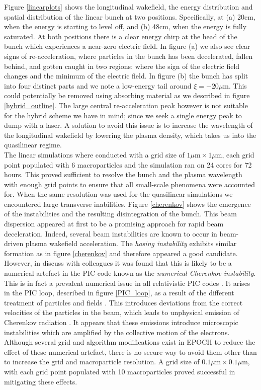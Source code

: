 \indent Figure \ref{linearplots} shows the longitudinal wakefield, the energy distribution and spatial distribution of the linear bunch at two positions. Specifically, at (a) 20cm, when the energy is starting to level off, and (b) 48cm, when the energy is fully saturated. At both positions there is a clear energy chirp at the head of the bunch which experiences a near-zero electric field. In figure (a) we also see clear signs of re-acceleration, where particles in the bunch has been decelerated, fallen behind, and gotten caught in two regions: where the sign of the electric field changes and the minimum of the electric field. In figure (b) the bunch has split into four distinct parts and we note a low-energy tail around $\xi=-20 \mu\text{m}$. This could potentially be removed using absorbing material as we described in figure \ref{hybrid_outline}. The large central re-acceleration peak however is not suitable for the hybrid scheme we have in mind; since we seek a single energy peak to dump with a laser. A solution to avoid this issue is to increase the wavelength of the longitudinal wakefield by lowering the plasma density, which takes us into the quasilinear regime. \\
\indent The linear simulations where conducted with a grid size of $1 \mu\text{m}\times 1\mu\text{m}$, each grid point populated with 6 macroparticles and the simulation ran on 24 cores for 72 hours. This proved sufficient to resolve the bunch and the plasma wavelength with enough grid points to ensure that all small-scale phenomena were accounted for. When the same resolution was used for the quasilinear simulations we encountered large transverse inabilities. Figure \ref{cherenkov} shows the emergence of the instabilities and the resulting disintegration of the bunch. This beam dispersion appeared at first to be a promising approach for rapid beam deceleration. Indeed, several beam instabilities are known to occur in beam-driven plasma wakefield acceleration. The \textit{hosing instability} \cite{Huang2007} exhibits similar formation as in figure \ref{cherenkov} and therefore appeared a good candidate. However, in discuss with colleagues it was found that this is likely to be a numerical artefact in the PIC code known as the \textit{numerical Cherenkov instability}. This is in fact a prevalent numerical issue in all relativistic PIC codes \cite{Godfrey2018}. It arises in the PIC loop, described in figure \ref{PIC_loop}, as a result of the different treatment of particles and fields  \cite{Blinne}. This introduces deviations from the correct velocities of the particles in the beam, which  leads to unphysical emission of Cherenkov radiation \cite{Godfrey2018}. It appears that these emissions introduce microscopic instabilities which are amplified by the collective motion of the electrons. Although several grid and algorithm modifications exist in EPOCH to reduce the effect of these numerical artefact, there is no secure way to avoid them other than to increase the grid and macroparticle resolution. A grid size of $0.1 \mu\text{m}\times 0.1\mu\text{m}$, with each grid point populated with 10 macroparticles proved successful in mitigating these effects. 
